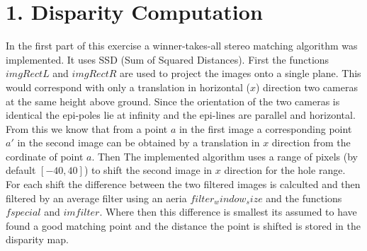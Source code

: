 \documentclass[12pt]{article}
\begin{document}
\maketitle


\section{1. Disparity Computation}

In the first part of this exercise a winner-takes-all stereo matching algorithm was implemented. It uses SSD (Sum of Squared Distances). First the functions $imgRectL$ and $imgRectR$ are used to project the images onto a single plane. This would correspond with only a translation in horizontal ($x$) direction two cameras at the same height above ground. 
\newline 
Since the orientation of the two cameras is identical the epi-poles lie at infinity and the epi-lines are parallel and horizontal. From this we know that from a point $a$ in the first image a corresponding point $a'$ in the second image can be obtained by a translation in $x$ direction from the cordinate of point $a$. 
\newline 
Then The implemented algorithm uses a range of pixels (by default $[-40, 40]$) to shift the second image in $x$ direction for the hole range. For each shift the difference between the two filtered images is calculted and then filtered by an average filter using an aeria $filter_window_size$ and the functions $fspecial$ and $imfilter$. Where then this difference is smallest its assumed to have found a good matching point and the distance the point is shifted is stored in the disparity map.  
\end{document}
